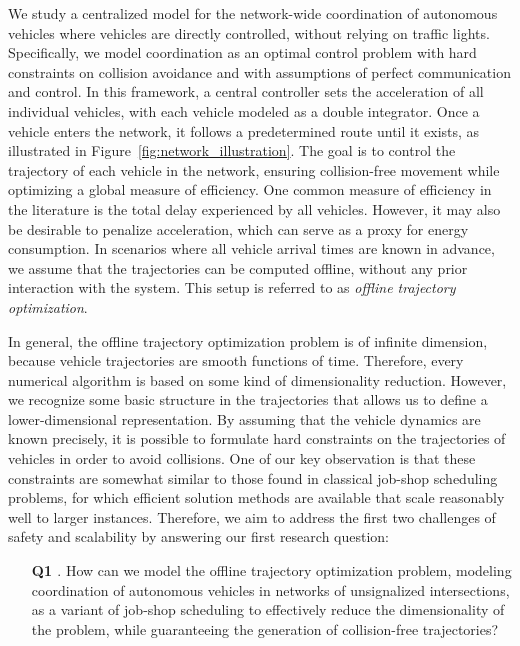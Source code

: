 \documentclass{article}
\makeatletter
\def\namedlabel#1#2{\begingroup
    #2%
    \def\@currentlabel{#2}%
    \phantomsection\label{#1}\endgroup
}
\theoremstyle{definition}
\theoremstyle{plain}
\makeatother
\begin{document}
We study a centralized model for the network-wide coordination of autonomous
vehicles where vehicles are directly controlled, without relying on traffic
lights. Specifically, we model coordination as an optimal control problem with
hard constraints on collision avoidance and with assumptions of perfect
communication and control. In this framework, a central controller sets the
acceleration of all individual vehicles, with each vehicle modeled as a double
integrator. Once a vehicle enters the network, it follows a predetermined route
until it exists, as illustrated in Figure~\ref{fig:network_illustration}. The
goal is to control the trajectory of each vehicle in the network, ensuring
collision-free movement while optimizing a global measure of efficiency. One
common measure of efficiency in the literature is the total delay experienced by
all vehicles. However, it may also be desirable to penalize acceleration, which
can serve as a proxy for energy consumption. In scenarios where all vehicle
arrival times are known in advance, we assume that the trajectories can be
computed offline, without any prior interaction with the system. This setup is
referred to as \textit{offline trajectory optimization}.

In general, the offline trajectory optimization problem is of infinite
dimension, because vehicle trajectories are smooth functions of time. Therefore,
every numerical algorithm is based on some kind of dimensionality reduction.
However, we recognize some basic structure in the trajectories that allows us to
define a lower-dimensional representation.
%
By assuming that the vehicle dynamics are known precisely, it is possible to
formulate hard constraints on the trajectories of vehicles in order to avoid
collisions. One of our key observation is that these constraints are somewhat
similar to those found in classical job-shop scheduling problems, for which
efficient solution methods are available that scale reasonably well to larger
instances.
%
Therefore, we aim to address the first two challenges of safety and scalability
by answering our first research question:
%
\begin{enumerate}
  \item[\textbf{\namedlabel{Q1}{Q1}}.] How can we model the offline trajectory optimization
        problem, modeling coordination of autonomous vehicles in networks of
        unsignalized intersections, as a variant of job-shop scheduling to
        effectively reduce the dimensionality of the problem, while guaranteeing
        the generation of collision-free trajectories?
\end{enumerate}
\end{document}
